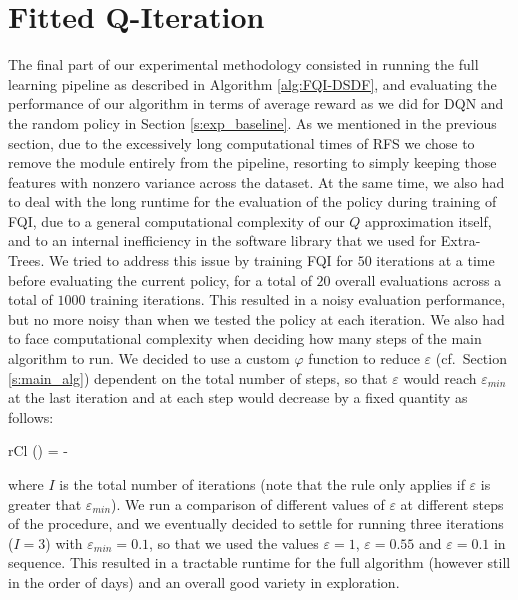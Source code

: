 \section{Fitted Q-Iteration} \label{s:exp_fqi}
The final part of our experimental methodology consisted in running the full
learning pipeline as described in Algorithm \ref{alg:FQI-DSDF}, and evaluating
the performance of our algorithm in terms of average reward as we did for DQN
and the random policy in Section \ref{s:exp_baseline}. 
As we mentioned in the previous section, due to the excessively long 
computational times of RFS we chose to remove the module entirely from the 
pipeline, resorting to simply keeping those features with nonzero variance 
across the dataset. 
At the same time, we also had to deal with the long runtime for the evaluation 
of the policy during training of FQI, due to a general computational complexity 
of our $Q$ approximation itself, and to an internal inefficiency in the 
software library that we used for Extra-Trees.
We tried to address this issue by training FQI for $50$ iterations at a time
before evaluating the current policy, for a total of $20$ overall evaluations
across a total of $1000$ training iterations. 
This resulted in a noisy evaluation performance, but no more noisy than when we
tested the policy at each iteration. 
We also had to face computational complexity when deciding how many steps
of the main algorithm to run. 
We decided to use a custom $\varphi$ function to reduce $\varepsilon$ (cf.\ 
Section \ref{s:main_alg}) dependent on the total number of steps, so that 
$\varepsilon$ would reach $\varepsilon_{min}$ at the last iteration and 
at each step would decrease by a fixed quantity as follows:
%
\begin{IEEEeqnarray}{rCl}
    \varphi(\varepsilon) = \varepsilon - 
\end{IEEEeqnarray}
%
where $I$ is the total number of iterations (note that the rule only 
applies if $\varepsilon$ is greater that $\varepsilon_{min}$). 
We run a comparison of different values of $\varepsilon$ at 
different steps of the procedure, and we eventually decided to settle for 
running three iterations ($I = 3$) with $\varepsilon_{min} = 0.1$, so that we 
used the values $\varepsilon = 1$, $\varepsilon = 0.55$ and 
$\varepsilon = 0.1$ in sequence. 
This resulted in a tractable runtime for the full algorithm (however 
still in the order of days) and an overall good variety in exploration. 

